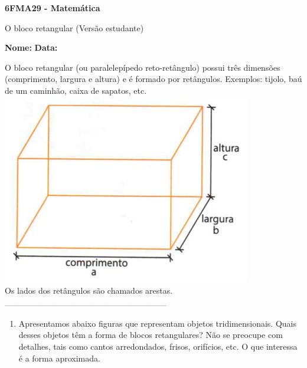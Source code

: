 \documentclass[a4paper,14pt]{article}
\begin{document}
	
	\noindent\textbf{6FMA29 - Matemática} 
	
	\begin{center}O bloco retangular (Versão estudante)
	\end{center}
	
	\noindent\textbf{Nome:} \underline{\hspace{10cm}}
	\noindent\textbf{Data:} \underline{\hspace{4cm}}
	
	
	\begin{multicols}{2}
		\noindent O bloco retangular (ou paralelepípedo reto-retângulo) possui três dimensões (comprimento, largura e altura) e é formado por retângulos. Exemplos: tijolo, baú de um caminhão, caixa de sapatos, etc. \\
		\includegraphics[width=1\linewidth]{6FMA29_imagens/imagem1} \\
		Os lados dos retângulos são chamados arestas. \\
		\noindent\textsubscript{-----------------------------------------------------------------------}
		\begin{enumerate} 
			\item Apresentamos abaixo figuras que representam objetos tridimensionais. Quais desses objetos têm a forma de blocos retangulares? Não se preocupe com detalhes, tais como cantos arredondados, frisos, orifícios, etc. O que interessa é a forma aproximada. \\

\end{enumerate}
\end{multicols}
\end{document}
